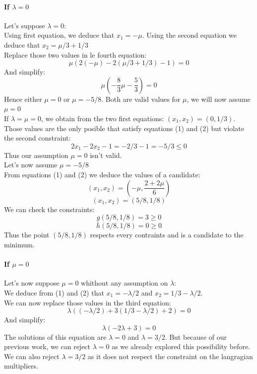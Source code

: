 \documentclass[a4paper, 10pt]{article}
\begin{document}
\paragraph{If $\lambda=0$}
Let's suppose $\lambda=0$:
\\
Using first equation, we deduce that $x_1=-\mu$. Using the second equation we deduce that $x_2=\mu/3+1/3$
\\
Replace those two values in le fourth equation:
$$
\mu(2(-\mu)-2(\mu/3+1/3)-1) = 0
$$
And simplify:
$$
\mu(-\frac{8}{3}\mu-\frac{5}{3})=0
$$
Hence either $\mu=0$ or $\mu=-5/8$. Both are valid values for $\mu$, we will now assume
$\mu=0$
\\
If $\lambda=\mu=0$, we obtain from the two first equations: $(x_1,x_2) = (0,1/3)$. Those values are the only
posible that satisfy equations (1) and (2) but violate the second constraint:
$$
2x_1-2x_2-1 = -2/3-1 = -5/3 \leq 0
$$
Thus our assumption $\mu=0$ isn't valid.
\\
Let's now assume $\mu=-5/8$
\\
From equations (1) and (2) we deduce the values of a candidate: 
$$
(x_1,x_2) = (-\mu, \frac{2+2\mu}{6})
$$
$$
(x_1,x_2) = (5/8, 1/8)
$$
We can check the constraints:
$$
g(5/8,1/8) = 3 \geq 0
$$
$$
\bar{h}(5/8,1/8) = 0 \geq 0
$$
Thus the point $(5/8, 1/8)$ respects every contraints and is a candidate to the minimum.

\paragraph{If $\mu=0$}
Let's now suppose $\mu=0$ whithout any assumption on $\lambda$:
\\
We deduce from (1) and (2) that $x_1=-\lambda/2$ and $x_2=1/3-\lambda/2$.
\\
We can now replace those values in the third equation:
$$
\lambda((-\lambda/2)+3(1/3-\lambda/2)+2) = 0
$$
And simplify:
$$
\lambda(-2\lambda+3) = 0
$$
The solutions of this equation are $\lambda=0$ and $\lambda=3/2$. But because of our previous work,
we can reject $\lambda=0$ as we already explored this possibility before. We can also reject $\lambda=3/2$ 
as it does not respect the constraint on the langragian multipliers.
\end{document}
